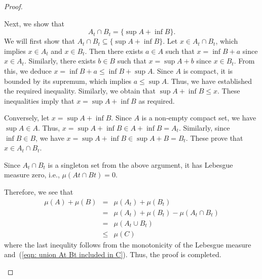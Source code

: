 \begin{proof}
\begin{enumerate}
\begin{enumerate}
            Next, we show that 
            \begin{equation*}
                A_t \cap B_t = \{\sup A + \inf B\}.
            \end{equation*}
            We will first show that \(A_t \cap B_t \subseteq \{\sup A + \inf B\}\). 
            Let \(x \in A_t \cap B_t\), which implies \(x \in A_t\) and \(x \in B_t\).
            Then there exists \(a \in A\) such that \(x = \inf B + a\) since \(x \in A_t\). 
            Similarly, there exists \(b \in B\) such that \(x = \sup A + b\) since \(x \in B_t\).
            From this, we deduce \(x = \inf B + a \leq \inf B + \sup A\). 
            Since \(A\) is compact, it is bounded by its supremum, which implies \(a \leq \sup A\).
            Thus, we have established the required inequality. 
            Similarly, we obtain that \(\sup A + \inf B \leq x\). 
            These inequalities imply that \(x = \sup A + \inf B\) as required.

            Conversely, let \(x = \sup A + \inf B\).
            Since \(A\) is a non-empty compact set, we have \(\sup A \in A\).
            Thus, \(x = \sup A + \inf B \in A + \inf B = A_t\).
            Similarly, since \(\inf B \in B\), we have \(x = \sup A + \inf B \in \sup A + B = B_t\).
            These prove that \(x \in A_t \cap B_t\).

            Since \(A_t \cap B_t\) is a singleton set from the above argument, it has Lebesgue measure zero, 
            i.e., \(\mu (At \cap Bt) = 0\).

            Therefore, we see that 
            \begin{eqnarray*}
                \mu(A) + \mu(B) & = & \mu(A_t) + \mu(B_t)\\
                & = & \mu(A_t) + \mu(B_t) - \mu(A_t \cap B_t)\\
                & = & \mu(A_t \cup B_t)\\
                & \leq & \mu (C)
            \end{eqnarray*}
            where the last inequlity follows from the monotonicity of the Lebesgue measure and~(\ref{eqn: union At Bt included in C}).
            Thus, the proof is completed.
        \end{enumerate}
    \end{enumerate}
\end{proof}
